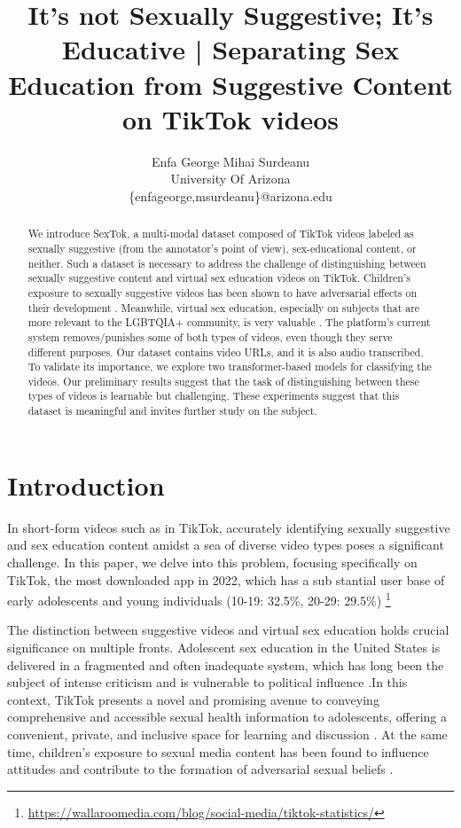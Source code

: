 \documentclass[11pt]{article}
\title{It’s not Sexually Suggestive; It’s Educative | Separating Sex Education from Suggestive Content on TikTok videos 
}
\author{Enfa George \tab Mihai Surdeanu \\
         University Of Arizona  \\ {\{enfageorge,msurdeanu\}}@arizona.edu}
\begin{document}
\maketitle
\begin{abstract}
We introduce SexTok, a multi-modal dataset composed of TikTok videos labeled as sexually suggestive (from the annotator's point of view), sex-educational content, or neither. Such a dataset is necessary to address the challenge of distinguishing between sexually suggestive content and virtual sex education videos on TikTok. Children’s exposure to sexually suggestive videos has been shown to have adversarial effects on their development \citep{collins2017sexual}. Meanwhile, virtual sex education, especially on subjects that are more relevant to the LGBTQIA+ community, is very valuable \citep{mitchell2014accessing}. The platform's current system removes/punishes some of both types of videos, even though they serve different purposes. Our dataset contains video URLs, and it is also audio transcribed. To validate its importance, we explore two transformer-based models for classifying the videos. Our preliminary results suggest that the task of distinguishing between these types of videos is learnable but challenging. These experiments suggest that this dataset is meaningful and invites further study on the subject.

\end{abstract}

\section{Introduction}

In short-form videos such as in TikTok, accurately identifying sexually suggestive and sex education content amidst a sea of diverse video types poses a significant challenge.  In this paper, we delve into this problem, focusing specifically on TikTok, the most downloaded app in 2022, which has a sub\- stantial user base of early adolescents and young individuals (10-19: 32.5\%, 20-29: 29.5\%) \footnote{\url{https://wallaroomedia.com/blog/social-media/tiktok-statistics/}} 

The distinction between suggestive videos and virtual sex education holds crucial significance on multiple fronts. Adolescent sex education in the United States is delivered in a fragmented and often inadequate system, which has long been the subject of intense criticism and is vulnerable to political influence \cite{fowler2021let}.In this context, TikTok presents a novel and promising avenue to conveying comprehensive and accessible sexual health information to adolescents, offering a convenient, private, and inclusive space for learning and discussion \cite{fowler2022sex}. At the same time, children's exposure to sexual media content has been found to influence attitudes and contribute to the formation of adversarial sexual beliefs \cite{collins2017sexual}.
\end{document}
